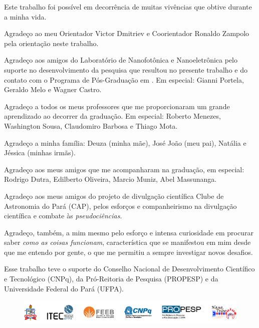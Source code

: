 

\begin{agradecimentos}

Este trabalho foi possível em decorrência de muitas vivências que obtive durante a minha vida.

Agradeço ao meu Orientador Victor Dmitriev e Coorientador Ronaldo Zampolo pela orientação neste trabalho.

Agradeço aos amigos do Laboratório de Nanofotônica e Nanoeletrônica pelo suporte no desenvolvimento da pesquisa que resultou no presente trabalho e do contato com o Programa de Pós-Graduação em \imprimircurso. Em especial: Gianni Portela, Geraldo Melo e Wagner Castro.

Agradeço a todos os meus professores que me proporcionaram um grande aprendizado ao decorrer da graduação. Em especial: Roberto Menezes, Washington Sousa, Claudomiro Barbosa e Thiago Mota.

Agradeço a minha família: Deuza (minha mãe), José João (meu pai), Natália e Jéssica (minhas irmãs).

Agradeço aos meus amigos que me acompanharam na graduação, em especial: Rodrigo Dutra, Edilberto Oliveira, Marcio Muniz, Abel Massunanga.

Agradeço aos meus amigos do projeto de divulgação científica Clube de Astronomia do Pará (CAP), pelos esforços e companheirismo na divulgação científica e combate às \textit{pseudociências}.

Agradeço, também, a mim mesmo pelo esforço e intensa curiosidade em procurar saber \textit{como as coisas funcionam}, característica que se manifestou em mim desde que me entendo por gente, o que me permitiu a sempre investigar novos desafios.

Esse trabalho teve o suporte do Conselho Nacional de Desenvolvimento Científico e Tecnológico (CNPq), da Pró-Reitoria de Pesquisa (PROPESP) e da Universidade Federal do Pará (UFPA).

\vfill

\begin{figure}[H]
    \centering
    \includegraphics{04-Figuras/Agradecimentos.png}
\end{figure}

\vfill


\end{agradecimentos}